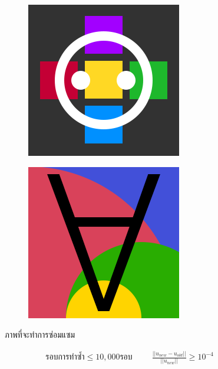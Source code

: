 \documentclass[xcolor=dvipsnames, xetex,serif]{beamer}
\numberwithin{equation}{section}
\begin{document}
\begin{frame}
\begin{figure}[H]
\begin{subfigure}{0.15\linewidth}
            \end{subfigure}
            \begin{subfigure}{0.15\linewidth}
                \centering
                \includegraphics[width=0.9\linewidth]{images/image_inpaint_synthetic/case04-toinpaint.png}
            \end{subfigure}
            \begin{subfigure}{0.15\linewidth}
                \centering
                \includegraphics[width=0.9\linewidth]{images/image_inpaint_synthetic/case05-toinpaint.png}
            \end{subfigure}
            \caption{ภาพที่จะทำการซ่อมแซม}
        \end{figure}
        \begin{align*}
            \text{รอบการทำซ้ำ} \leq 10,000 \text{รอบ} \hspace{1cm}
            \frac{|| u_{new} - u_{old} ||}{|| u_{new} ||} \geq 10^{-4}
        \end{align*}
    \end{frame}
\end{document}
